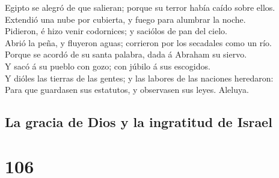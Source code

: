  Egipto se alegró de que salieran; porque su terror había
caído sobre ellos.\\
 Extendió una nube por cubierta, y fuego para alumbrar la
noche.\\
 Pidieron, é hizo venir codornices; y saciólos de pan del
cielo.\\
 Abrió la peña, y fluyeron aguas; corrieron por los
secadales como un río.\\
 Porque se acordó de su santa palabra, dada á Abraham su
siervo.\\
 Y sacó á su pueblo con gozo; con júbilo á sus escogidos.\\
 Y dióles las tierras de las gentes; y las labores de las
naciones heredaron:\\
 Para que guardasen sus estatutos, y observasen sus leyes.
Aleluya.

\hypertarget{la-gracia-de-dios-y-la-ingratitud-de-israel}{%
\subsection{La gracia de Dios y la ingratitud de
Israel}\label{la-gracia-de-dios-y-la-ingratitud-de-israel}}

\hypertarget{section-105}{%
\section{106}\label{section-105}}

